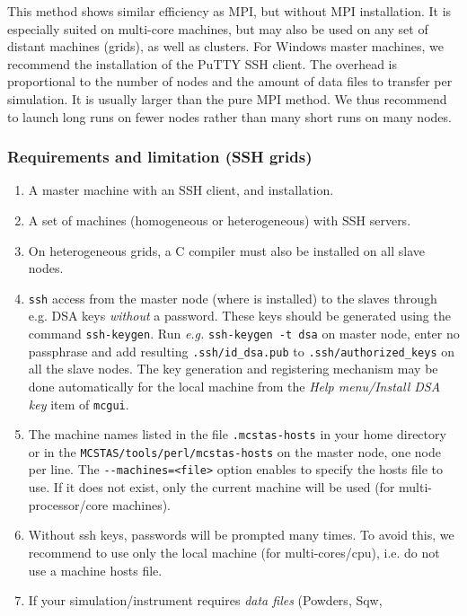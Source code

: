 This method shows similar efficiency as MPI, but without MPI installation. It is
especially suited on multi-core machines, but may also be used on any set of
distant machines (grids), as well as clusters. For Windows master machines, we
recommend the installation of the PuTTY SSH client. The overhead is proportional
to the number of nodes and the amount of data files to transfer per
simulation. It is usually larger than the pure MPI method. We thus recommend to
launch long runs on fewer nodes rather than many short runs on many nodes.

\subsubsection{Requirements and limitation (SSH grids)}

  \begin{enumerate}
  \item{A master machine with an SSH client, and \MCS installation.}
  \item{A set of machines (homogeneous or heterogeneous) with SSH servers.}
  \item{On heterogeneous grids, a C compiler must also be installed on all slave
      nodes.}
  \item{\texttt{ssh} access from the master node (where \MCS is
      installed) to the slaves through e.g. DSA keys \emph{without} a
      password. These keys should be generated using the command
      \texttt{ssh-keygen}. Run \emph{e.g.} \texttt{ssh-keygen -t dsa} on
      master node, enter no passphrase and add resulting
      \texttt{.ssh/id\_dsa.pub} to \texttt{.ssh/authorized\_keys}
      on all the slave nodes. The key generation and registering mechanism
      may be done automatically for the local machine from the
      \emph{Help menu/Install DSA key} item of \verb+mcgui+.}
  \item{The machine names listed in the file \texttt{.mcstas-hosts} in
      your home directory or in the \texttt{MCSTAS/tools/perl/mcstas-hosts} on
      the master node, one node per line. The \verb'--machines=<file>' option
      enables to specify the hosts file to use. If it does not exist, only
      the current machine will be used (for multi-processor/core machines).}
  \item{Without ssh keys, passwords will be prompted many times. To avoid this,
      we recommend to use only the local machine (for multi-cores/cpu), i.e. do
      not use a machine hosts file.}
  \item{If your simulation/instrument requires \emph{data files} (Powders, Sqw,
}
\end{enumerate}
